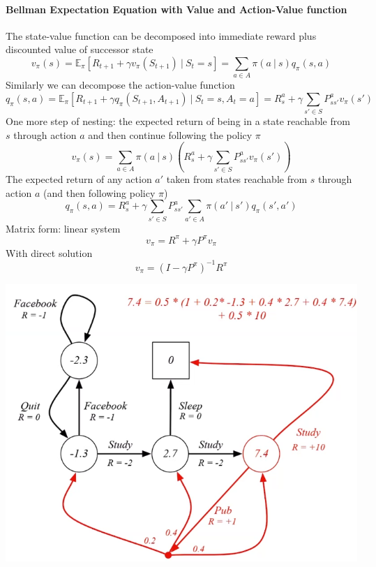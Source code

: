\documentclass[10pt]{report}
\begin{document}
\paragraph{Bellman Expectation Equation with Value and Action-Value function}
The state-value function can be decomposed into immediate reward plus discounted value of successor state
$$v_\pi(s) = \mathbb{E}_\pi[R_{t+1} + \gamma v_\pi(S_{t+1})\:|\:S_t=s] = \sum_{a\in A }\pi(a\:|\:s)q_\pi(s,a)$$
Similarly we can decompose the action-value function
$$q_\pi(s,a) = \mathbb{E}_\pi[R_{t+1}+\gamma q_\pi(S_{t+1}, A_{t+1})\:|\:S_t=s, A_t=a] = R_s^a + \gamma\sum_{s'\in S} P_{ss'}^av_\pi(s')$$
One more step of nesting: the expected return of being in a state reachable from $s$ through action $a$ and then continue following the policy $\pi$
$$v_\pi(s) = \sum_{a\in A} \pi(a\:|\:s) \left(R_s^a + \gamma\sum_{s'\in S} P_{ss'}^a v_\pi(s')\right)$$
The expected return of any action $a'$ taken from states reachable from $s$ through action $a$ (and then following policy $\pi$)
$$q_\pi(s,a) = R_s^a + \gamma\sum_{s'\in S}P_{ss'}^a \sum_{a'\in A}\pi(a'\:|\:s')q_\pi(s',a')$$
Matrix form: linear system
$$v_\pi = R^\pi + \gamma P^\pi v_\pi$$
With direct solution
$$v_\pi = (I-\gamma P^\pi)^{-1}R^\pi$$
\begin{center}
	\includegraphics[scale=0.5]{162.png}
\end{center}
\end{document}

